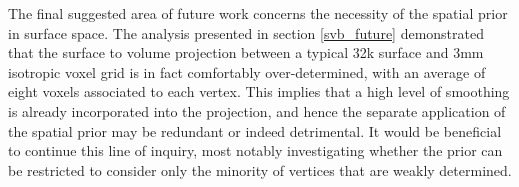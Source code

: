 \documentclass[12pt]{report}
\begin{document}
The final suggested area of future work concerns the necessity of the spatial prior in surface space. The analysis presented in section \ref{svb_future} demonstrated that the surface to volume projection between a typical 32k surface and 3mm isotropic voxel grid is in fact comfortably over-determined, with an average of eight voxels associated to each vertex. This implies that a high level of smoothing is already incorporated into the projection, and hence the separate application of the spatial prior may be redundant or indeed detrimental. It would be beneficial to continue this line of inquiry, most notably investigating whether the prior can be restricted to consider only the minority of vertices that are weakly determined. 
 \newpage 

\singlespacing
 \newpage %

\end{document}
